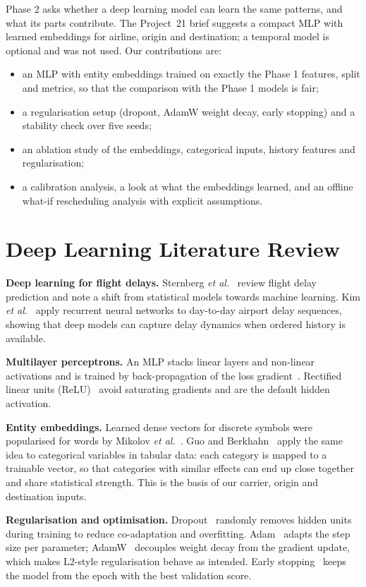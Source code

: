\documentclass[conference]{IEEEtran}
\begin{document}
Phase 2 asks whether a deep learning model can learn the same patterns, and what its parts contribute. The
Project~21 brief suggests a compact MLP with learned embeddings for airline, origin and destination; a temporal
model is optional and was not used. Our contributions are:
\begin{itemize}
\item an MLP with entity embeddings trained on exactly the Phase 1 features, split and metrics, so that the
comparison with the Phase 1 models is fair;
\item a regularisation setup (dropout, AdamW weight decay, early stopping) and a stability check over five seeds;
\item an ablation study of the embeddings, categorical inputs, history features and regularisation;
\item a calibration analysis, a look at what the embeddings learned, and an offline what-if rescheduling analysis
with explicit assumptions.
\end{itemize}

\section{Deep Learning Literature Review}
\textbf{Deep learning for flight delays.} Sternberg \emph{et al.}~\cite{sternberg2017review} review flight delay
prediction and note a shift from statistical models towards machine learning. Kim \emph{et al.}~\cite{kim2016deep}
apply recurrent neural networks to day-to-day airport delay sequences, showing that deep models can capture delay
dynamics when ordered history is available.

\textbf{Multilayer perceptrons.} An MLP stacks linear layers and non-linear activations and is trained by
back-propagation of the loss gradient~\cite{rumelhart1986learning}. Rectified linear units
(ReLU)~\cite{nair2010rectified} avoid saturating gradients and are the default hidden activation.

\textbf{Entity embeddings.} Learned dense vectors for discrete symbols were popularised for words by Mikolov
\emph{et al.}~\cite{mikolov2013distributed}. Guo and Berkhahn~\cite{guo2016entity} apply the same idea to
categorical variables in tabular data: each category is mapped to a trainable vector, so that categories with
similar effects can end up close together and share statistical strength. This is the basis of our carrier,
origin and destination inputs.

\textbf{Regularisation and optimisation.} Dropout~\cite{srivastava2014dropout} randomly removes hidden units during
training to reduce co-adaptation and overfitting. Adam~\cite{kingma2015adam} adapts the step size per parameter;
AdamW~\cite{loshchilov2019decoupled} decouples weight decay from the gradient update, which makes L2-style
regularisation behave as intended. Early stopping~\cite{prechelt1998early} keeps the model from the epoch with the
best validation score.
\end{document}
